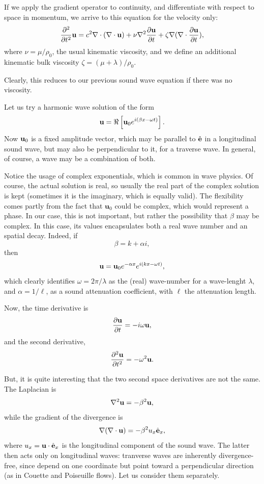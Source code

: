 If we apply the gradient operator to continuity, and differentiate
with respect to space in momentum, we arrive to this equation for
the velocity only:
\begin{equation}
  \label{eq:sound_att_Fourier}
  \frac{\partial^2 }{\partial t^2 } \mathbf{u} =
  c^2\nabla \cdot (\nabla\cdot\mathbf{u}) + \nu \nabla^2\frac{\partial\mathbf{u}}{\partial t} +
  \zeta \nabla (\nabla\cdot \frac{\partial\mathbf{u}}{\partial t} ) ,
\end{equation}
where $\nu=\mu/\rho_0$, the usual kinematic viscosity, and we define
an additional kinematic bulk viscosity $\zeta=(\mu+\lambda)/\rho_0$.

Clearly, this reduces to our previous sound wave equation if there was
no viscosity.

Let us try a harmonic wave solution of the form
\begin{equation}
  \label{eq:wave_form_visc}
  \mathbf{u} = \Re\left[ \mathbf{u}_0 e^{i( \beta x - \omega t)} \right].
\end{equation}
Now $\mathbf{u}_0$ is a fixed amplitude vector, which may be parallel to
$\hat{\mathbf{e}}$ in a longitudinal sound wave, but may also be perpendicular to
it, for a traverse wave. In general, of course, a wave may be a
combination of both.

Notice the usage of complex exponentials, which is common in wave
physics. Of course, the actual solution is real, so usually the real
part of the complex solution is kept (sometimes it is the imaginary,
which is equally valid). The flexibility comes partly from the fact
that $\mathbf{u}_0$ could be complex, which would represent a phase.
In our case, this is not important, but rather the possibility that
$\beta$ may be complex. In this case, its values encapsulates both a
real wave number and an spatial decay. Indeed, if
\[
  \beta = k + \alpha i ,
\]
then
\[
  \mathbf{u} = \mathbf{u}_0e^{- \alpha x} e^{i(k x - \omega t )} ,
\]
which clearly identifies $ \omega=2\pi /\lambda$ as the (real)
wave-number for a wave-lenght $ \lambda$, and $ \alpha=1 /\ell $, as a
sound attenuation coefficient, with $ \ell $ the attenuation length.

Now, the time derivative is
\[
  \frac{\partial \mathbf{u}  }{\partial t }  = -i \omega \mathbf{u} ,
\]
and the second derivative,
\[
  \frac{\partial^2 \mathbf{u}   }{\partial t^2 }  = -\omega^2 \mathbf{u}.
\]

But, it is quite interesting that the two second space derivatives are
not the same. The Laplacian is
\[
\nabla^2 \mathbf{u} = -\beta^2 \mathbf{u},
\]
while the gradient of the divergence is
\[
\nabla (\nabla\cdot \mathbf{u} ) = -\beta^2 u_x \hat{\mathbf{e}}_x,
\]
where $u_x= \mathbf{u}\cdot \hat{\mathbf{e}}_x$ is the longitudinal component of the
sound wave.
%
The latter then acts only on longitudinal waves: tranverse waves are
inherently divergence-free, since depend on one coordinate but point
toward a perpendicular direction (as in Couette and Poiseuille flows).
Let us consider them separately.


